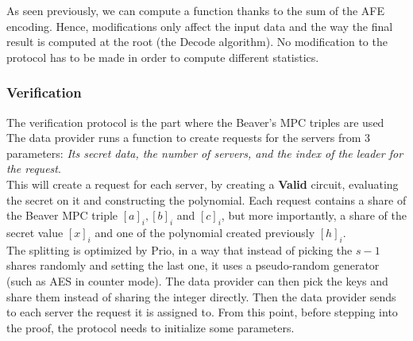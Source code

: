 \documentclass{article}
\begin{document}
As seen previously, we can compute a function thanks to the sum of the AFE encoding. Hence, modifications only affect the input data and the way the final result is computed at the root (the Decode algorithm). No modification to the protocol has to be made in order to compute different statistics.

\subsubsection*{Verification}
The verification protocol is the part where the Beaver's MPC triples are used The data provider runs a function to create requests for the servers from 3 parameters: \textit{Its secret data, the number of servers, and the index of the leader for the request}.\\
This will create a request for each server, by creating a \textbf{Valid} circuit, evaluating the secret on it and constructing the polynomial. Each request contains a share of the Beaver MPC triple $[a]_i, [b]_i $ and $ [c]_i$, but more importantly, a share of the secret value $[x]_i$ and one of the polynomial created previously $[h]_i$.\\

The splitting is optimized by Prio, in a way that instead of picking the $s-1$ shares randomly and setting the last one, it uses a pseudo-random generator (such as AES in counter mode). The data provider can then pick the keys and share them instead of sharing the integer directly.
Then the data provider sends to each server the request it is assigned to. From this point, before stepping into the proof, the protocol needs to initialize some parameters.\\
\end{document}
